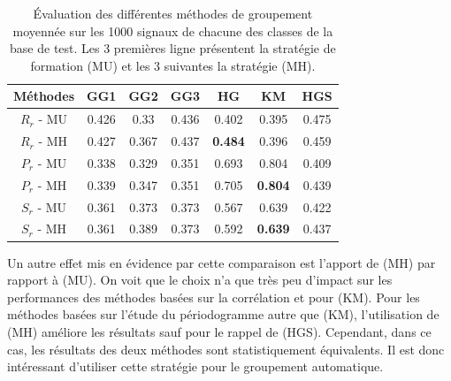 \documentclass{gretsi}
\begin{document}
\begin{table}[h]
\begin{tabular}{|c|c|c|c|c|c|c|}
	\hline
	Méthodes & GG1 & GG2 & GG3 & HG & KM & HGS\\\hline 
	$R_r$ - MU & 0.426 & 0.33 & 0.436 & 0.402 & 0.395 & 0.475\\\hline
$R_r$ - MH & 0.427 & 0.367 & 0.437 & \textbf{0.484} & 0.396 & 0.459\\\hline
$P_r$ - MU & 0.338 & 0.329 & 0.351 & 0.693 & 0.804 & 0.409\\\hline
$P_r$ - MH & 0.339 & 0.347 & 0.351 & 0.705 & \textbf{0.804} & 0.439\\\hline
$S_r$ - MU & 0.361 & 0.373 & 0.373 & 0.567 & 0.639 & 0.422\\\hline
$S_r$ - MH & 0.361 & 0.389 & 0.373 & 0.592 & \textbf{0.639} & 0.437\\\hline

\end{tabular}
\caption{\'Evaluation des différentes méthodes de groupement moyennée sur les 1000 signaux de chacune des classes de la base de test. Les 3 premières ligne présentent la stratégie de formation (MU) et les 3 suivantes la stratégie (MH).}
\label{tab:res}
\end{table}

Un autre effet mis en évidence par cette comparaison est l'apport de (MH) par rapport à (MU).
On voit que le choix n'a que très peu d'impact sur les performances des méthodes basées sur la corrélation et pour (KM).
Pour les méthodes basées sur l'étude du périodogramme autre que (KM), l'utilisation de (MH) améliore les résultats sauf pour le rappel de (HGS). 
Cependant, dans ce cas, les résultats des deux méthodes sont statistiquement équivalents.
Il est donc intéressant d'utiliser cette stratégie pour le groupement automatique.
\end{document}
